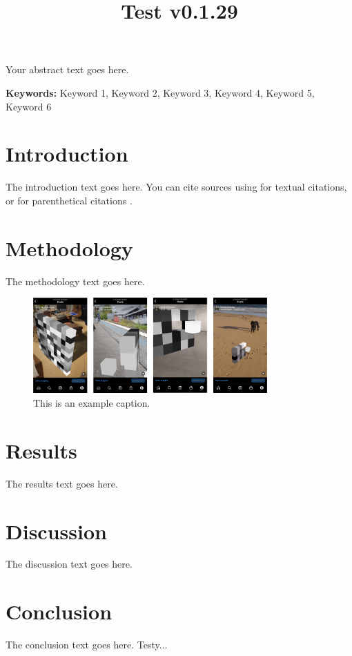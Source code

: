 \documentclass[12pt]{article}
\title{Test v0.1.29}
\date{}
\makeatletter
\renewenvironment{abstract}
  {\begin{flushleft}
   \bfseries \abstractname\vspace{-1em} %
   \end{flushleft}
   \list{}{%
     \setlength{\leftmargin}{0mm}%
     \setlength{\rightmargin}{\leftmargin}%
   }%
   \item\relax}
  {\endlist}
\newcommand{\keywords}[1]{%
    \noindent\textbf{Keywords:} #1
}
\renewcommand{\maketitle}{
  \begin{flushleft} %
    \textbf{\@title} %
    \vspace{1em} %
  \end{flushleft}
}
\makeatother
\begin{document}
\maketitle

\begin{abstract}
Your abstract text goes here.
\end{abstract}

\keywords{Keyword 1, Keyword 2, Keyword 3, Keyword 4, Keyword 5, Keyword 6}

\section*{Introduction}
The introduction text goes here. You can cite sources using \textcite{RindCmplxtyAndClmt1999} for textual citations, or \parencite{RindCmplxtyAndClmt1999} for parenthetical citations \parencite[see][p.35]{Bell_PhilosophyAtTheEdgeOfChaos_2006}.

\section*{Methodology}
The methodology text goes here.

\begin{figure}[htb]
    \centering
    \includegraphics[width=0.8\textwidth]{figures/algorithms-1.png}  %
    \caption{This is an example caption.}
    \label{fig:exampleFigure}
  \end{figure}

\section*{Results}
The results text goes here.

\section*{Discussion}
The discussion text goes here.

\section*{Conclusion}
The conclusion text goes here. Testy...

\printpostnotes

\printbibliography[heading=bibliography]
\end{document}
